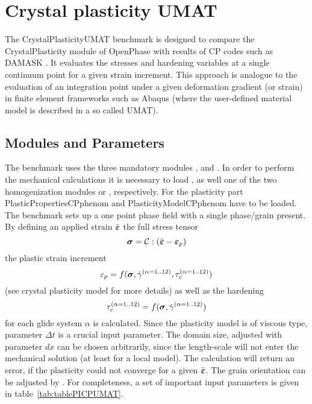 \section{Crystal plasticity UMAT}
\label{sec:example_cpumat}
The CrystalPlasticityUMAT benchmark is designed to compare the CrystalPlasticity module of OpenPhase with results of CP codes such as DAMASK . It evaluates the stresses and hardening variables at a single continuum point for a given strain increment. This approach is analogue to the evaluation of an integration point under a given deformation gradient (or strain) in finite element frameworks such as Abaqus (where the user-defined material model is described in a so called UMAT).

\subsection{Modules and Parameters}
The benchmark uses the three mandatory modules ,  and . In order to perform the mechanical calculations it is necessary to load ,  as well one of the two homogenization modules  or , respectively. For the plasticity part PlasticPropertiesCPphenom and PlasticityModelCPphenom have to be loaded.\\
The benchmark sets up a one point phase field with a single phase/grain present. By defining an applied strain $\bar{\mbox{\boldmath $\varepsilon$}}$ the full stress tensor
\begin{equation}
	\mbox{\boldmath $\sigma$} = \mathcal{C} : \left(\bar{\mbox{\boldmath $\varepsilon$}} - \mbox{\boldmath $\varepsilon$}_p\right)
\end{equation}
the plastic strain increment
\begin{equation}
	\varepsilon_p = f(\mbox{\boldmath $\sigma$}, \dot{\gamma}^{(\alpha = 1..12)}, \tau_c^{(\alpha = 1..12)})
\end{equation}
(see crystal plasticity model for more details) as well as the hardening
\begin{equation}
	\tau_c^{(\alpha = 1..12)} = f(\mbox{\boldmath $\sigma$}, \dot{\gamma}^{(\alpha = 1..12)})
\end{equation}
for each glide system $\alpha$ is calculated. Since the plasticity model is of viscous type, parameter $\Delta t$ is a crucial input parameter. The domain size, adjusted with parameter $dx$ can be chosen arbitrarily, since the length-scale will not enter the mechanical solution (at least for a local model). The calculation will return an error, if the plasticity could not converge for a given $\bar{\mbox{\boldmath $\varepsilon$}}$. The grain orientation can be adjusted by . For completeness, a set of important input parameters is given in table~\ref{tab:tablePICPUMAT}. 
